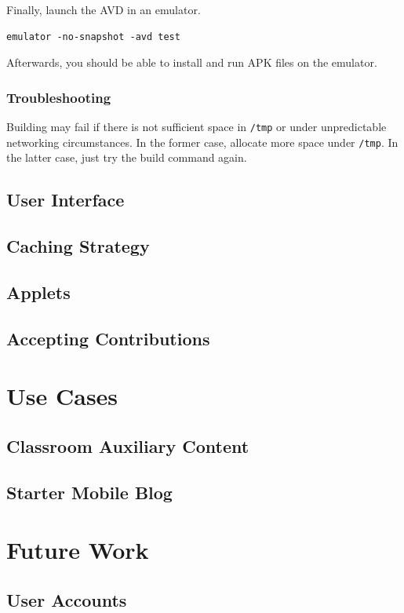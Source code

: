 \documentclass[12pt]{report}
\begin{document}
Finally, launch the AVD in an emulator.

\begin{verbatim}
emulator -no-snapshot -avd test
\end{verbatim}

Afterwards, you should be able to install and run APK files on the emulator.

        \subsection{Troubleshooting}

Building may fail if there is not sufficient space in \texttt{/tmp} or under
unpredictable networking circumstances. In the former case, allocate more space
under \texttt{/tmp}. In the latter case, just try the build command again.

    \section{User Interface}
    \section{Caching Strategy}
    \section{Applets}
    \section{Accepting Contributions}

\chapter{Use Cases}
    \section{Classroom Auxiliary Content}
    \section{Starter Mobile Blog}

\chapter{Future Work}
    \section{User Accounts}
\end{document}

